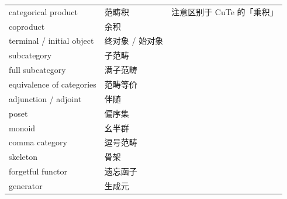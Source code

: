 \begin{longtable}{@{}lll@{}}
categorical product & 范畴积 & 注意区别于 CuTe 的「乘积」 \\
coproduct & 余积 & \\
terminal / initial object & 终对象 / 始对象 & \\
subcategory & 子范畴 & \\
full subcategory & 满子范畴 & \\
equivalence of categories & 范畴等价 & \\
adjunction / adjoint & 伴随 & \\
poset & 偏序集 & \\
monoid & 幺半群 & \\
comma category & 逗号范畴 & \\
skeleton & 骨架 & \\
forgetful functor & 遗忘函子 & \\
generator & 生成元 & \\
\bottomrule
\end{longtable}
